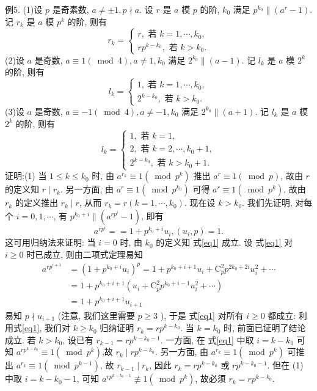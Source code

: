 例5. (1)设 $p$ 是奇素数, $a \neq \pm 1, p \nmid a$. 设 $r$ 是 $a$ 模 $p$ 的阶, $k_0$ 满足 $p^{k_0} \|\left(a^r-1\right)$. 记 $r_k$ 是 $a$ 模 $p^k$ 的阶, 则有
$$
r_k=\left\{\begin{array}{l}
r, \text { 若 } k=1, \cdots, k_0, \\
r p^{k-k_0}, \text { 若 } k>k_0 .
\end{array}\right.
$$
(2)设 $a$ 是奇数, $a \equiv 1(\bmod 4), a \neq 1, k_0$ 满足 $2^{k_0} \|(a-1)$. 记 $l_k$ 是 $a$ 模 $2^k$ 的阶, 则有
$$
l_k=\left\{\begin{array}{l}
1, \text { 若 } k=1, \cdots, k_0, \\
2^{k-k_0}, \text { 若 } k>k_0 .
\end{array}\right.
$$
(3)设 $a$ 是奇数, $a \equiv-1(\bmod 4), a \neq-1, k_0$ 满足 $2^{k_0} \|(a+1)$. 记 $l_k$ 是 $a$ 模 $2^k$ 的阶, 则有
$$
l_k=\left\{\begin{array}{l}
1, \text { 若 } k=1, \\
2, \text { 若 } k=2, \cdots, k_0+1, \\
2^{k-k_0}, \text { 若 } k>k_0+1 .
\end{array}\right.
$$
证明:(1) 当 $1 \leqslant k \leqslant k_0$ 时, 由 $a^{r_k} \equiv 1\left(\bmod p^k\right)$ 推出 $a^r \equiv 1(\bmod p)$, 故由 $r$ 的定义知 $r \mid r_k$. 另一方面, 由 $a^r \equiv 1\left(\bmod p^{k_0}\right)$ 可得 $a^r \equiv 1\left(\bmod p^k\right)$, 故由 $r_k$ 的定义推出 $r_k \mid r$, 从而 $r_k=r\left(k=1, \cdots, k_0\right)$.
现在设 $k>k_0$. 我们先证明, 对每个 $i=0,1, \cdots$, 有 $p^{k_0+i} \|\left(a^{r p^i}-1\right)$,
即有
$$
a^{r p^i}==1+p^{k_0+i} u_i,\left(u_i, p\right)=1 . \label{eq1}
$$
这可用归纳法来证明: 当 $i=0$ 时, 由 $k_0$ 的定义知 式\ref{eq1} 成立.
设 式\ref{eq1} 对 $i \geqslant 0$ 时已成立, 则由二项式定理易知
$$
\begin{aligned}
a^{r p^{i+1}} & =\left(1+p^{k_0+i} u_i\right)^p=1+p^{k_0+i+1} u_i+\mathrm{C}_p^2 p^{2 k_0+2 i} u_i^2+\cdots \\
& =1+p^{k_0+i+1}\left(u_i+\mathrm{C}_p^2 p^{k_0+i-1} u_i^2+\cdots\right) \\
& =1+p^{k_0+i+1} u_{i+1}
\end{aligned}
$$
易知 $p \nmid u_{i+1}$ (注意, 我们这里需要 $p \geqslant 3$ ), 于是 式\ref{eq1} 对所有 $i \geqslant 0$ 都成立:
利用式\ref{eq1}, 我们对 $k \geqslant k_0$ 归纳证明 $r_k=r p^{k-k_0}$. 当 $k=k_0$ 时, 前面已证明了结论成立.
若 $k>k_0$, 设已有 $r_{k-1}=r p^{k-k_0-1}$. 一方面, 在 式\ref{eq1} 中取 $i=k-k_0$ 可知 $a^{r p^{k-k_0}} \equiv 1\left(\bmod p^k\right)$,故 $r_k \mid r p^{k-k_0}$. 另一方面, 由 $a^{r_k} \equiv 1\left(\bmod p^k\right)$ 可推出 $a^{r_k} \equiv 1\left(\bmod p^{k-1}\right)$, 故 $r_{k-1} \mid r_k$, 因此 $r_k=r p^{k-k_0}$ 或 $r p^{k-k_0-1}$. 但在 (1) 中取 $i=k- k_0-1$, 可知 $a^{r p^{k-k_0-1}} \not \equiv 1\left(\bmod p^k\right)$, 故必须 $r_k=r p^{k-k_0}$.
